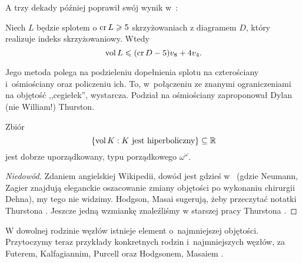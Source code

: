 A trzy dekady później poprawił swój wynik w~\cite{adams2013}:

\begin{proposition}
    Niech $L$ będzie splotem o $\operatorname{cr} L \geqslant 5$ skrzyżowaniach z diagramem $D$, który realizuje indeks skrzyżowaniowy.
    Wtedy
    \begin{equation}
        \operatorname{vol} L \leqslant (\operatorname{cr} D - 5) v_8 + 4v_4.
    \end{equation}
\end{proposition}

Jego metoda polega na podzieleniu dopełnienia splotu na czterościany i~ośmiościany oraz policzeniu ich.
To, w~połączeniu ze znanymi ograniczeniami na objętość ,,cegiełek'', wystarcza.
Podział na ośmiościany zaproponował Dylan (nie William!) Thurston.
%

\begin{proposition}
    Zbiór
    \begin{equation}
        \{\operatorname{vol} K: K \textrm{ jest hiperboliczny}\} \subseteq \mathbb R
    \end{equation}
    jest dobrze uporządkowany, typu porządkowego $\omega^\omega$.
\end{proposition}

\begin{proof}[Niedowód]
    Zdaniem angielskiej Wikipedii, dowód jest gdzieś w~\cite{neumann1985} (gdzie Neumann, Zagier znajdują eleganckie oszacowanie zmiany objętości po wykonaniu chirurgii Dehna), my tego nie widzimy.
%
%
    Hodgson, Masai \cite{hodgson2013} sugerują, żeby przeczytać notatki Thurstona \cite{thurston2002}.
%
%
    Jeszcze jedną wzmiankę znaleźliśmy w starszej pracy Thurstona \cite[s. 365]{thurston1982}.
\end{proof}

W dowolnej rodzinie węzłów istnieje element o~najmniejszej objętości.
Przytoczymy teraz przykłady konkretnych rodzin i~najmniejszych węzłów, za Futerem, Kalfagiannim, Purcell \cite[s. 16-17]{purcell2019} oraz Hodgsonem, Masaiem \cite[s. 296]{hodgson2013}.
%
%
%
%
%

